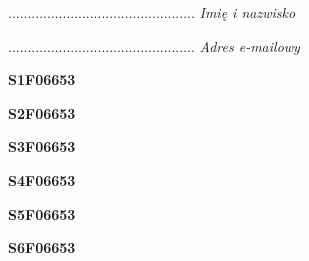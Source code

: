 \begin{turn}{90}\begin{minipage}{\linewidth} \vspace{20mm} ................................................  \textit{Imię i nazwisko}\end{minipage}\end{turn}

\begin{turn}{90}\begin{minipage}{\linewidth} \vspace{20mm} ................................................  \textit{Adres e-mailowy}\end{minipage}\end{turn}

\begin{turn}{90}\huge \begin{minipage}{\linewidth} \vspace{10mm}\textbf{S1F06653}\end{minipage}\end{turn}

\begin{turn}{90}\huge \begin{minipage}{\linewidth} \vspace{10mm}\textbf{S2F06653}\end{minipage}\end{turn}

\begin{turn}{90}\huge \begin{minipage}{\linewidth} \vspace{10mm}\textbf{S3F06653}\end{minipage}\end{turn}

\begin{turn}{90}\huge \begin{minipage}{\linewidth} \vspace{10mm}\textbf{S4F06653}\end{minipage}\end{turn}

\begin{turn}{90}\huge \begin{minipage}{\linewidth} \vspace{10mm}\textbf{S5F06653}\end{minipage}\end{turn}

\begin{turn}{90}\huge \begin{minipage}{\linewidth} \vspace{10mm}\textbf{S6F06653}\end{minipage}\end{turn}

